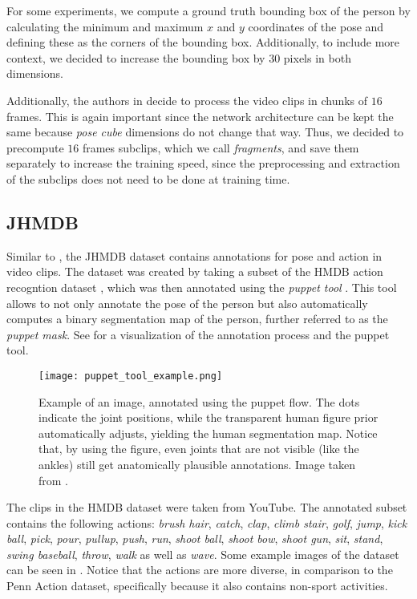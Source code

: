 For some experiments, we compute a ground truth bounding box of the person by calculating the minimum and maximum $x$ and $y$ coordinates of the pose and defining these as the corners of the bounding box.
Additionally, to include more context, we decided to increase the bounding box by $30$ pixels in both dimensions.

Additionally, the authors in \cite{luvizon_2d/3d_2018} decide to process the video clips in chunks of $16$ frames.
This is again important since the network architecture can be kept the same because \textit{pose cube} dimensions do not change that way.
Thus, we decided to precompute $16$ frames subclips, which we call \textit{fragments}, and save them separately to increase the training speed, since the preprocessing and extraction of the subclips does not need to be done at training time. 

\subsection{JHMDB}
\label{sec:exp-jhmdb}

Similar to \cite{zhang_actemes_2013} , the JHMDB dataset \cite{jhuang_towards_2013} contains annotations for pose and action in video clips.
The dataset was created by taking a subset of the HMDB action recogntion dataset \cite{kuehne_hmdb:_2011}, which was then annotated using the \textit{puppet tool} \cite{zuffi_pictorial_2012}.
This tool allows to not only annotate the pose of the person but also automatically computes a binary segmentation map of the person, further referred to as the \textit{puppet mask}.
See  for a visualization of the annotation process and the puppet tool.

\begin{figure}[htb!]
    \centering
    \texttt{[image: puppet\_tool\_example.png]}
    \caption{Example of an image, annotated using the puppet flow. The dots indicate the joint positions, while the transparent human figure prior automatically adjusts, yielding the human segmentation map. Notice that, by using the figure, even joints that are not visible (like the ankles) still get anatomically plausible annotations. Image taken from \cite{noauthor_jhmdb_nodate}.}
    \label{fig:puppet_tool_example}
\end{figure}

The clips in the HMDB dataset were taken from YouTube.
The annotated subset contains the following actions:
\textit{brush hair}, \textit{catch}, \textit{clap}, \textit{climb stair}, \textit{golf}, \textit{jump}, \textit{kick ball}, \textit{pick}, \textit{pour}, \textit{pullup}, \textit{push}, \textit{run}, \textit{shoot ball}, \textit{shoot bow}, \textit{shoot gun}, \textit{sit}, \textit{stand}, \textit{swing baseball}, \textit{throw}, \textit{walk} as well as \textit{wave}.
Some example images of the dataset can be seen in .
Notice that the actions are more diverse, in comparison to the Penn Action dataset, specifically because it also contains non-sport activities.

